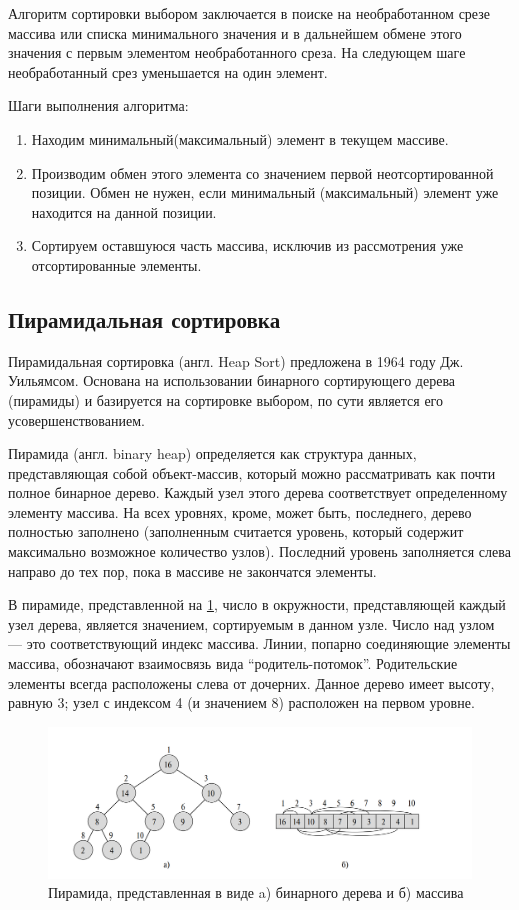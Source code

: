 Алгоритм сортировки выбором заключается в поиске на необработанном срезе массива или списка минимального значения и в дальнейшем обмене этого значения с первым элементом необработанного среза. На следующем шаге необработанный срез уменьшается на один элемент.

Шаги выполнения алгоритма:
\begin{enumerate} 
	\item Находим  минимальный(максимальный)  элемент  в  текущем  массиве. 
	\item Производим обмен этого элемента со значением первой неотсортированной позиции.  Обмен  не  нужен,  если минимальный (максимальный) элемент уже находится на данной позиции. 
	\item Сортируем оставшуюся часть массива, исключив из рассмотрения уже отсортированные элементы. 
\end{enumerate}

\subsection{Пирамидальная сортировка}

Пирамидальная сортировка (англ. Heap Sort) предложена в 1964 году Дж. Уильямсом. Основана на использовании бинарного сортирующего дерева (пирамиды) и базируется на сортировке выбором, по сути является его усовершенствованием.

Пирамида (англ. binary heap) определяется как структура данных, представляющая собой объект-массив, который можно рассматривать как почти полное бинарное дерево. Каждый узел этого дерева соответствует определенному элементу массива. На всех уровнях, кроме, может быть, последнего, дерево полностью заполнено (заполненным считается уровень, который содержит максимально возможное количество узлов). Последний уровень заполняется слева направо до тех пор, пока в массиве не закончатся элементы. 

В пирамиде, представленной на \ref{fig:heap_structs}, число в окружности, представляющей каждый узел дерева, является значением, сортируемым в данном узле. Число над узлом — это соответствующий индекс массива. Линии, попарно соединяющие элементы массива, обозначают взаимосвязь вида “родитель-потомок”. Родительские элементы всегда расположены слева от дочерних. Данное дерево имеет высоту, равную 3; узел с индексом 4 (и значением 8) расположен на первом уровне.

\begin{figure}[h]
	\centering
	\includegraphics[height=0.25\textheight]{img/heap_structs.png}
	\caption{Пирамида, представленная в виде a) бинарного дерева и б) массива}
	\label{fig:heap_structs}
\end{figure}

